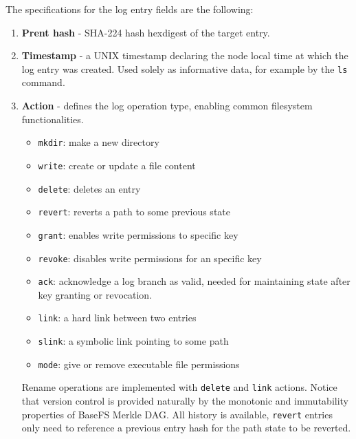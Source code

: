 \documentclass{sig-alternate}
\begin{document}
The specifications for the log entry fields are the following:

\begin{enumerate}
\item \textbf{Prent hash} - SHA-224 hash hexdigest of the target entry.
\item \textbf{Timestamp} - a UNIX timestamp declaring the node local time at which the log entry was created. Used solely as informative data, for example by the \texttt{ls} command.
\item \textbf{Action} - defines the log operation type, enabling common filesystem functionalities.
    \begin{itemize}
    \item \texttt{mkdir}: make a new directory
    \item \texttt{write}: create or update a file content
    \item \texttt{delete}: deletes an entry
    \item \texttt{revert}: reverts a path to some previous state
    \item \texttt{grant}: enables write permissions to specific key
    \item \texttt{revoke}: disables write permissions for an specific key
    \item \texttt{ack}: acknowledge a log branch as valid, needed for maintaining state after key granting or revocation.
    \item \texttt{link}: a hard link between two entries
    \item \texttt{slink}: a symbolic link pointing to some path
    \item \texttt{mode}: give or remove executable file permissions
    \end{itemize}

Rename operations are implemented with \texttt{delete} and \texttt{link} actions. Notice that version control is provided naturally by the monotonic and immutability properties of BaseFS Merkle DAG. All history is available, \texttt{revert} entries only need to reference a previous entry hash for the path state to be reverted.


\end{enumerate}
\end{document}
